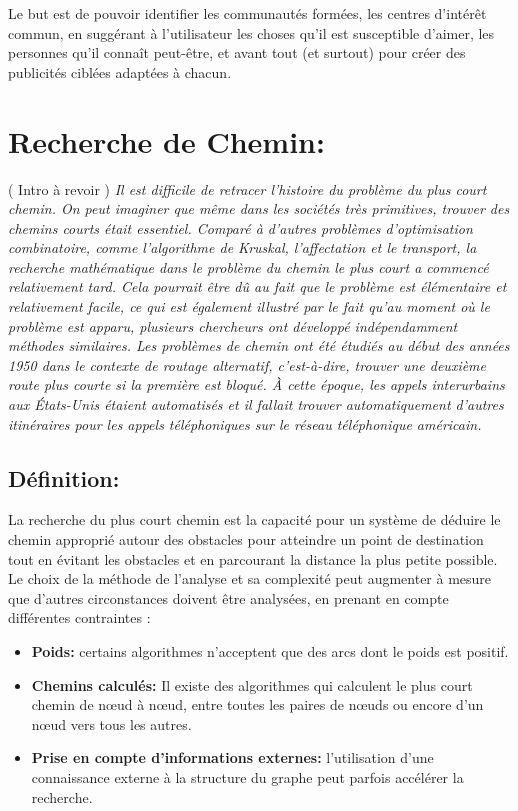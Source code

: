 Le but est de pouvoir identifier les communautés formées, les centres d'intérêt commun, en suggérant à l'utilisateur les choses qu'il est susceptible d'aimer, les personnes qu'il connaît peut-être, et avant tout (et surtout) pour créer des publicités ciblées adaptées à chacun.


\section{Recherche de Chemin:}
( Intro à revoir ) \newline
\emph{Il est difficile de retracer l'histoire du problème du plus court chemin. On peut imaginer que même dans les sociétés très primitives, trouver des chemins courts était essentiel. Comparé à d'autres problèmes d'optimisation combinatoire, comme l'algorithme de Kruskal, l'affectation et le transport, la recherche mathématique dans le problème du chemin le plus court a commencé relativement tard. Cela pourrait être dû au fait que le problème est élémentaire et relativement facile, ce qui est également illustré par le fait qu'au moment où le problème est apparu, plusieurs chercheurs ont développé indépendamment méthodes similaires.
Les problèmes de chemin ont été étudiés au début des années 1950 dans le contexte de \emph{routage alternatif}, c'est-à-dire, trouver une deuxième route plus courte si la première est bloqué. À cette époque, les appels interurbains aux États-Unis étaient automatisés et il fallait trouver automatiquement d'autres itinéraires pour les appels téléphoniques sur le réseau téléphonique américain.
}

\subsection{Définition:}
La recherche du plus court chemin est la capacité pour un système de déduire le chemin approprié autour des obstacles pour atteindre un point de destination tout en évitant les obstacles et en parcourant la distance la plus petite possible.
Le choix de la méthode de l'analyse et sa complexité peut augmenter à mesure que d'autres circonstances doivent être analysées, en prenant en compte différentes contraintes :

\begin{itemize}
	\item \textbf{Poids:} certains algorithmes n'acceptent que des arcs dont le poids est positif.
	\item \textbf{Chemins calculés:} Il existe des algorithmes qui calculent le plus court chemin de nœud à nœud, entre toutes les paires de nœuds ou encore d'un nœud vers tous les autres.
	\item \textbf{Prise en compte d'informations externes:} l'utilisation d'une connaissance externe à la structure du graphe peut parfois accélérer la recherche.
\end{itemize}

